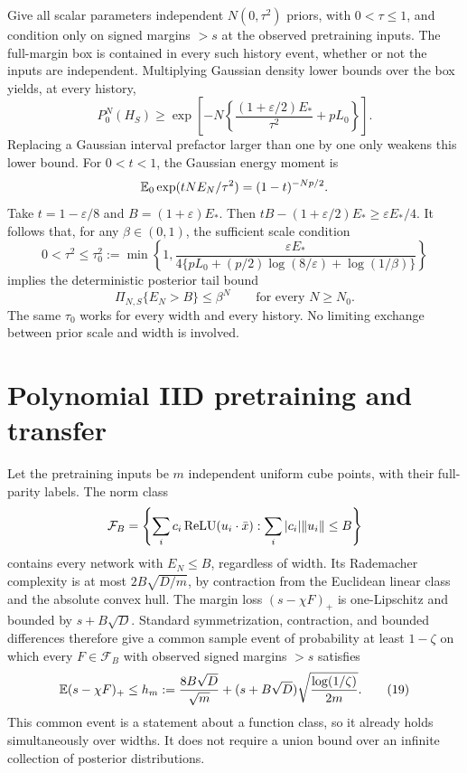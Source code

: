 Give all scalar parameters independent $N(0,\tau^2)$ priors, with
$0<\tau\le1$, and condition only on signed margins $>s$ at the observed
pretraining inputs. The full-margin box is contained in every such
history event, whether or not the inputs are independent. Multiplying
Gaussian density lower bounds over the box yields, at every history,
\[
 P_0^N(H_S)\ge
 \exp\left[-N\left\{\frac{(1+\varepsilon/2)E_*}{\tau^2}
                                                    +pL_0\right\}\right].
 \tag{16}
\]
Replacing a Gaussian interval prefactor larger than one by one only
weakens this lower bound. For $0<t<1$, the Gaussian energy moment is
\[
 \mathbb E_0\exp(tNE_N/\tau^2)=(1-t)^{-Np/2}.
\]
Take $t=1-\varepsilon/8$ and $B=(1+\varepsilon)E_*$.
Then $tB-(1+\varepsilon/2)E_*\ge\varepsilon E_*/4$.
It follows that, for any $\beta\in(0,1)$, the sufficient scale condition
\[
 0<\tau^2\le\tau_0^2:=
 \min\left\{1,
 \frac{\varepsilon E_*}
 {4\{pL_0+(p/2)\log(8/\varepsilon)+\log(1/\beta)\}}\right\}
 \tag{17}
\]
implies the deterministic posterior tail bound
\[
                  \Pi_{N,S}\{E_N>B\}\le\beta^N
                  \qquad\text{for every }N\ge N_0.     \tag{18}
\]
The same $\tau_0$ works for every width and every history. No limiting
exchange between prior scale and width is involved.

\section{Polynomial IID pretraining and transfer}
Let the pretraining inputs be $m$ independent uniform cube points, with
their full-parity labels. The norm class
\[
 \mathcal F_B=\left\{\sum_i c_i\operatorname{ReLU}(u_i\cdot\bar x):
                               \sum_i|c_i|\|u_i\|\le B\right\}
\]
contains every network with $E_N\le B$, regardless of width.
Its Rademacher complexity is at most $2B\sqrt{D/m}$, by contraction
from the Euclidean linear class and the absolute convex hull.
The margin loss $(s-\chi F)_+$ is one-Lipschitz and bounded by
$s+B\sqrt D$. Standard symmetrization, contraction, and bounded
differences therefore give a common sample event of probability
at least $1-\zeta$ on which every $F\in\mathcal F_B$ with observed
signed margins $>s$ satisfies
\[
 \mathbb E(s-\chi F)_+\le h_m:=\frac{8B\sqrt D}{\sqrt m}
            +(s+B\sqrt D)\sqrt{\frac{\log(1/\zeta)}{2m}}.
 \tag{19}
\]
This common event is a statement about a function class, so it already
holds simultaneously over widths. It does not require a union bound
over an infinite collection of posterior distributions.

